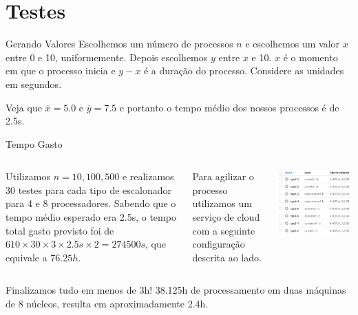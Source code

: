 \documentclass{beamer}
\begin{document}
\section{Testes}

\begin{frame}{Gerando Valores}
	\justifying
	Escolhemos um número de processos $n$ e escolhemos um valor $x$ entre  0 e 10, uniformemente. Depois escolhemos $y$ entre $x$ e 10. $x$ é o momento em que o processo inicia e $y-x$ é a duração do processo. Considere as unidades em segundos.
	
	Veja que $\overline{x} = 5.0$ e $\overline{y} = 7.5$ e portanto o tempo médio dos nossos processos é de 2.5s.
\end{frame}


\begin{frame}{Tempo Gasto}
	\begin{columns}[T,onlytextwidth]
		\justifying
		Utilizamos $n = 10, 100, 500$ e realizamos 30 testes para cada tipo de escalonador para 4 e 8 processadores. Sabendo que o tempo médio esperado era 2.5s, o tempo total gasto previsto foi de $610 \times 30 \times 3 \times 2.5s \times 2 = 274500s$, que equivale a $76.25h$.
		
		Para agilizar o processo utilizamos um serviço de cloud com a seguinte configuração descrita ao lado.
		
		
		\begin{center}
			\includegraphics[scale=0.4]{cloud}
		\end{center}
		
	\end{columns}
	
	
	{\tiny *Finalizamos tudo em menos de 3h! 38.125h de processamento em duas máquinas de 8 núcleos, resulta em aproximadamente 2.4h.}
\end{frame}
\end{document}

